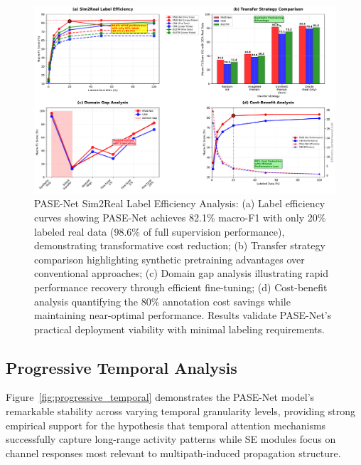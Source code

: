 \documentclass[journal]{IEEEtran}
\begin{document}
\begin{figure}[t]
\centering
\includegraphics[width=\columnwidth]{plots/fig5_label_efficiency.pdf}
\caption{PASE-Net Sim2Real Label Efficiency Analysis: (a) Label efficiency curves showing PASE-Net achieves 82.1\% macro-F1 with only 20\% labeled real data (98.6\% of full supervision performance), demonstrating transformative cost reduction; (b) Transfer strategy comparison highlighting synthetic pretraining advantages over conventional approaches; (c) Domain gap analysis illustrating rapid performance recovery through efficient fine-tuning; (d) Cost-benefit analysis quantifying the 80\% annotation cost savings while maintaining near-optimal performance. Results validate PASE-Net's practical deployment viability with minimal labeling requirements.}
\label{fig:label_efficiency}
\end{figure}


\subsection{Progressive Temporal Analysis}

Figure~\ref{fig:progressive_temporal} demonstrates the PASE-Net model's remarkable stability across varying temporal granularity levels, providing strong empirical support for the hypothesis that temporal attention mechanisms successfully capture long-range activity patterns while SE modules focus on channel responses most relevant to multipath-induced propagation structure.
\end{document}
